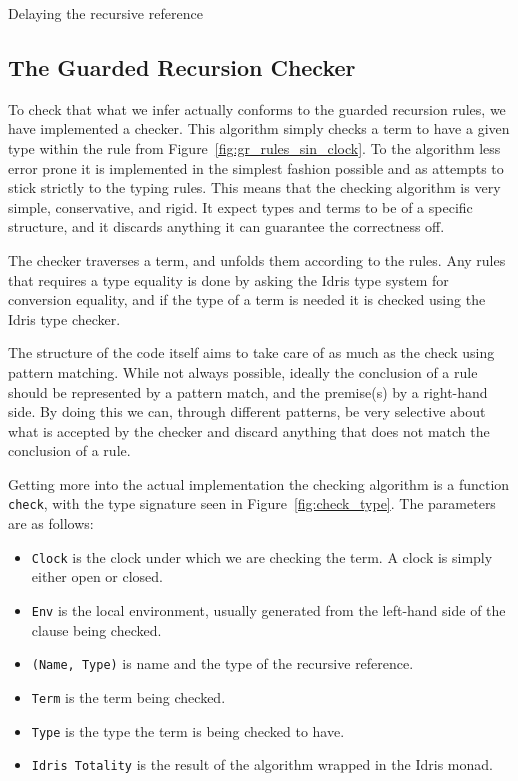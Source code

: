 Delaying the recursive reference


\subsection{The Guarded Recursion Checker}
To check that what we infer actually conforms to the guarded recursion rules, we
have implemented a checker. This algorithm simply checks a term to have a given
type within the rule from Figure~\ref{fig:gr_rules_sin_clock}. To the algorithm
less error prone it is implemented in the simplest fashion possible and as
attempts to stick strictly to the typing rules. This means that the checking
algorithm is very simple, conservative, and rigid. It expect types and terms to
be of a specific structure, and it discards anything it can guarantee the
correctness off. 

The checker traverses a term, and unfolds them according to the rules. Any rules
that requires a type equality is done by asking the Idris type system for
conversion equality, and if the type of a term is needed it is checked using the
Idris type checker.

The structure of the code itself aims to take care of as much as the check using
pattern matching. While not always possible, ideally the conclusion of a rule
should be represented by a pattern match, and the premise(s) by a right-hand
side. By doing this we can, through different patterns, be very selective about
what is accepted by the checker and discard anything that does not match the
conclusion of a rule.

Getting more into the actual implementation the checking algorithm is a function
\texttt{check}, with the type signature seen in Figure~\ref{fig:check_type}. The
parameters are as follows:

\begin{itemize}
\item \texttt{Clock} is the clock under which we are checking the term. A clock
  is simply either open or closed.
\item \texttt{Env} is the local environment, usually generated from the
  left-hand side of the clause being checked.
\item \texttt{(Name, Type)} is name and the type of the recursive
  reference. 
\item \texttt{Term} is the term being checked.
\item \texttt{Type} is the type the term is being checked to have.
\item \texttt{Idris Totality} is the result of the algorithm wrapped in the
  Idris monad. 
\end{itemize}

